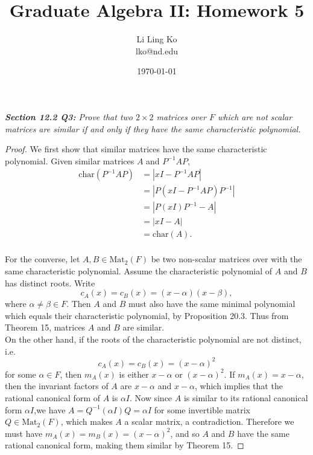 \documentclass{article}
\begin{document}
\title{Graduate Algebra II: Homework 5}
\author{Li Ling Ko\\ lko@nd.edu}
\date{\today}
\maketitle

\it \textbf{Section 12.2 Q3:} Prove that two $2\times2$ matrices over $F$
  which are not scalar matrices are similar if and only if they have the
  same characteristic polynomial.
  \begin{proof}
    We first show that similar matrices have the same characteristic
    polynomial. Given similar matrices $A$ and $P^{-1}AP$,
    \begin{align*}
      \text{char}(P^{-1}AP) &=|xI-P^{-1}AP|\\
      &=|P(xI-P^{-1}AP)P^{-1}|\\
      &=|P(xI)P^{-1}-A|\\
      &=|xI-A|\\
      &=\text{char}(A).\\
    \end{align*}

    For the converse, let $A,B\in\text{Mat}_2(F)$ be two non-scalar
    matrices over with the same characteristic polynomial. Assume the
    characteristic polynomial of $A$ and $B$ has distinct roots. Write
    \[c_A(x) =c_B(x) =(x-\alpha)(x-\beta),\]
    where $\alpha\neq\beta\in F$.
    Then $A$ and $B$ must also have the same minimal polynomial which
    equals their characteristic polynomial, by Proposition 20.3. Thus from
    Theorem 15, matrices $A$ and $B$ are similar.\\

    On the other hand, if the roots of the characteristic polynomial are
    not distinct, i.e.
    \[c_A(x)=c_B(x)=(x-\alpha)^2\]
    for some $\alpha\in F$, then $m_A(x)$ is either $x-\alpha$ or
    $(x-\alpha)^2$. If $m_A(x)=x-\alpha$, then the invariant factors of $A$
    are $x-\alpha$ and $x-\alpha$, which implies that the rational
    canonical form of $A$ is $\alpha I$. Now since $A$ is similar to its
    rational canonical form $\alpha I$,we have $A=Q^{-1}(\alpha I)Q=\alpha
    I$ for some invertible matrix $Q\in\text{Mat}_2(F)$, which makes $A$ a
    scalar matrix, a contradiction. Therefore we must have
    $m_A(x)=m_B(x)=(x-\alpha)^2$, and so $A$ and $B$ have the same rational
    canonical form, making them similar by Theorem 15.
  \end{proof}
\end{document}

